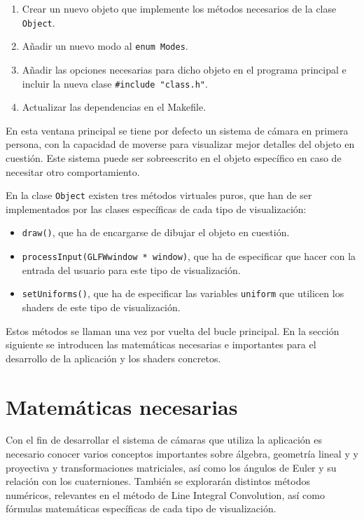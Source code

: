 \begin{enumerate}
		\item Crear un nuevo objeto que implemente los métodos necesarios
				de la clase \verb|Object|.
		\item Añadir un nuevo modo al \verb|enum Modes|.
		\item Añadir las opciones necesarias para dicho objeto en el programa
				principal e incluir la nueva clase \verb|#include "class.h"|.
		\item Actualizar las dependencias en el Makefile.
\end{enumerate}

En esta ventana principal se tiene por defecto un sistema de cámara en primera
persona, con la capacidad de moverse para visualizar mejor detalles del objeto
en cuestión. Este sistema puede ser sobreescrito en el objeto específico en
caso de necesitar otro comportamiento. 

En la clase \verb|Object| existen tres métodos virtuales puros, que han de ser
implementados por las clases específicas de cada tipo de visualización:


\begin{itemize}
		\item \verb|draw()|, que ha de encargarse de dibujar el objeto en
				cuestión.
		\item \verb|processInput(GLFWwindow * window)|, que ha de especificar que
				hacer con la entrada del usuario para este tipo de
				visualización.
		\item \verb|setUniforms()|, que ha de especificar las variables
				\verb|uniform| que utilicen los shaders de este tipo de
				visualización.
\end{itemize}

Estos métodos se llaman una vez por vuelta del bucle principal. En la sección
siguiente se introducen las matemáticas necesarias e importantes para el
desarrollo de la aplicación y los shaders concretos.

\section{Matemáticas necesarias}
\label{makereference5.4}

Con el fin de desarrollar el sistema de cámaras que utiliza la aplicación es
necesario conocer varios conceptos importantes sobre álgebra, geometría lineal y
y proyectiva y transformaciones matriciales, así como los ángulos de Euler y su
relación con los cuaterniones. También se explorarán distintos métodos
numéricos, relevantes en el método de Line Integral Convolution, así como
fórmulas matemáticas específicas de cada tipo de visualización.

